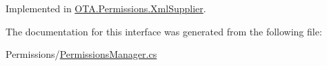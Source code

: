Implemented in \hyperlink{class_o_t_a_1_1_permissions_1_1_xml_supplier_a38706ab21a953108a94bee975fc4146d}{O\+T\+A.\+Permissions.\+Xml\+Supplier}.



The documentation for this interface was generated from the following file\+:\begin{DoxyCompactItemize}
\item 
Permissions/\hyperlink{_permissions_manager_8cs}{Permissions\+Manager.\+cs}\end{DoxyCompactItemize}
